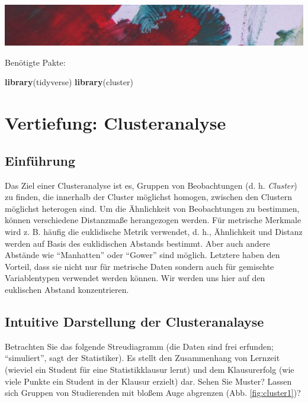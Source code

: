 \documentclass[12pt,ngerman,]{book}
\newenvironment{Shaded}{\begin{snugshade}}{\end{snugshade}}
\newcommand{\KeywordTok}[1]{\textcolor[rgb]{0.13,0.29,0.53}{\textbf{{#1}}}}
\newcommand{\NormalTok}[1]{{#1}}
\renewenvironment{Shaded}{\begin{kframe}}{\end{kframe}}
\begin{document}
\includegraphics[width=1\linewidth]{images/farb1}

Benötigte Pakte:

\begin{Shaded}
\begin{Highlighting}[]
\KeywordTok{library}\NormalTok{(tidyverse)}
\KeywordTok{library}\NormalTok{(cluster)}
\end{Highlighting}
\end{Shaded}

\chapter{Vertiefung: Clusteranalyse}\label{vertiefung-clusteranalyse}

\section{Einführung}\label{einfuhrung}

Das Ziel einer Clusteranalyse ist es, Gruppen von Beobachtungen (d. h.
\emph{Cluster}) zu finden, die innerhalb der Cluster möglichst homogen,
zwischen den Clustern möglichst heterogen sind. Um die Ähnlichkeit von
Beobachtungen zu bestimmen, können verschiedene Distanzmaße herangezogen
werden. Für metrische Merkmale wird z. B. häufig die euklidische Metrik
verwendet, d. h., Ähnlichkeit und Distanz werden auf Basis des
euklidischen Abstands bestimmt. Aber auch andere Abstände wie
``Manhatten'' oder ``Gower'' sind möglich. Letztere haben den Vorteil,
dass sie nicht nur für metrische Daten sondern auch für gemischte
Variablentypen verwendet werden können. Wir werden uns hier auf den
euklischen Abstand konzentrieren.

\section{Intuitive Darstellung der
Clusteranalayse}\label{intuitive-darstellung-der-clusteranalayse}

Betrachten Sie das folgende Streudiagramm (die Daten sind frei erfunden;
``simuliert'', sagt der Statistiker). Es stellt den Zusammenhang von
Lernzeit (wieviel ein Student für eine Statistikklausur lernt) und dem
Klausurerfolg (wie viele Punkte ein Student in der Klausur erzielt) dar.
Sehen Sie Muster? Lassen sich Gruppen von Studierenden mit bloßem Auge
abgrenzen (Abb. \ref{fig:cluster1})?
\end{document}
